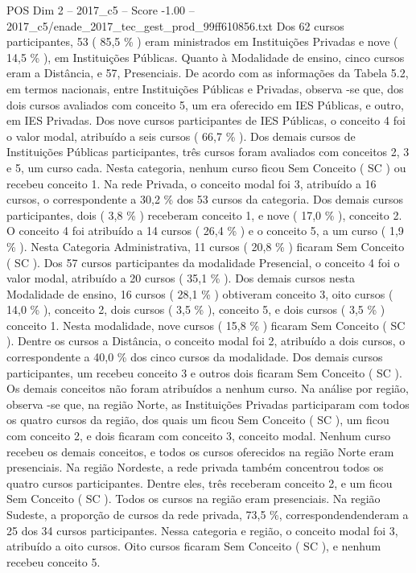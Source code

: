 \begin{textsample}{POS Dim 2 – 2017\_c5 – Score -1.00 – 2017\_c5/enade\_2017\_tec\_gest\_prod\_99ff610856.txt}
Dos 62 cursos participantes, 53 ( 85,5 \% ) eram ministrados em Instituições Privadas e nove ( 14,5 \% ), em Instituições Públicas.
Quanto à Modalidade de ensino, cinco cursos eram a Distância, e 57, Presenciais.
De acordo com as informações da Tabela 5.2, em termos nacionais, entre Instituições Públicas e Privadas, observa -se que, dos dois cursos avaliados com conceito 5, um era oferecido em IES Públicas, e outro, em IES Privadas.
Dos nove cursos participantes de IES Públicas, o conceito 4 foi o valor modal, atribuído a seis cursos ( 66,7 \% ).
Dos demais cursos de Instituições Públicas participantes, três cursos foram avaliados com conceitos 2, 3 e 5, um curso cada.
Nesta categoria, nenhum curso ficou Sem Conceito ( SC ) ou recebeu conceito 1.
Na rede Privada, o conceito modal foi 3, atribuído a 16 cursos, o correspondente a 30,2 \% dos 53 cursos da categoria.
Dos demais cursos participantes, dois ( 3,8 \% ) receberam conceito 1, e nove ( 17,0 \% ), conceito 2.
O conceito 4 foi atribuído a 14 cursos ( 26,4 \% ) e o conceito 5, a um curso ( 1,9 \% ).
Nesta Categoria Administrativa, 11 cursos ( 20,8 \% ) ficaram Sem Conceito ( SC ).
Dos 57 cursos participantes da modalidade Presencial, o conceito 4 foi o valor modal, atribuído a 20 cursos ( 35,1 \% ).
Dos demais cursos nesta Modalidade de ensino, 16 cursos ( 28,1 \% ) obtiveram conceito 3, oito cursos ( 14,0 \% ), conceito 2, dois cursos ( 3,5 \% ), conceito 5, e dois cursos ( 3,5 \% ) conceito 1.
Nesta modalidade, nove cursos ( 15,8 \% ) ficaram Sem Conceito ( SC ).
Dentre os cursos a Distância, o conceito modal foi 2, atribuído a dois cursos, o correspondente a 40,0 \% dos cinco cursos da modalidade.
Dos demais cursos participantes, um recebeu conceito 3 e outros dois ficaram Sem Conceito ( SC ).
Os demais conceitos não foram atribuídos a nenhum curso.
Na análise por região, observa -se que, na região Norte, as Instituições Privadas participaram com todos os quatro cursos da região, dos quais um ficou Sem Conceito ( SC ), um ficou com conceito 2, e dois ficaram com conceito 3, conceito modal.
Nenhum curso recebeu os demais conceitos, e todos os cursos oferecidos na região Norte eram presenciais.
Na região Nordeste, a rede privada também concentrou todos os quatro cursos participantes.
Dentre eles, três receberam conceito 2, e um ficou Sem Conceito ( SC ).
Todos os cursos na região eram presenciais.
Na região Sudeste, a proporção de cursos da rede privada, 73,5 \%, correspondendenderam a 25 dos 34 cursos participantes.
Nessa categoria e região, o conceito modal foi 3, atribuído a oito cursos.
Oito cursos ficaram Sem Conceito ( SC ), e nenhum recebeu conceito 5.

\end{textsample}
